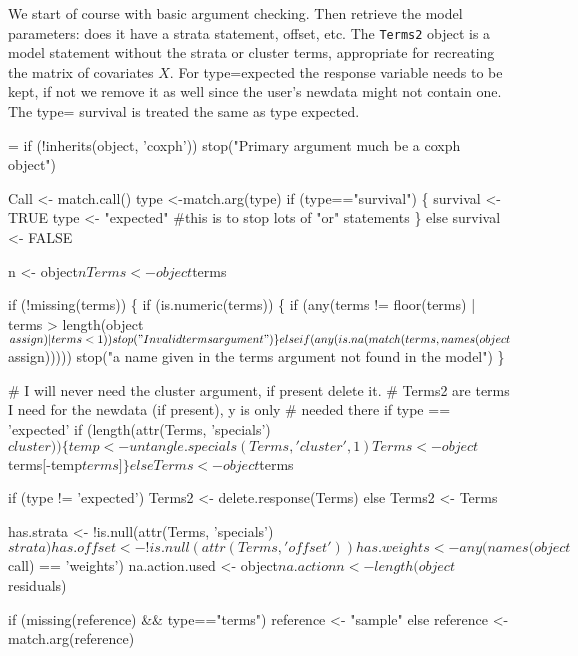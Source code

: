 \documentclass{article}
\newcommand{\code}[1]{\texttt{#1}}
\begin{document}
We start of course with basic argument checking.
Then retrieve the model parameters: does it have a strata
statement, offset, etc.  
The \code{Terms2} object is a model statement without the strata or cluster terms,
appropriate for recreating the matrix of covariates $X$.
For type=expected the response variable needs to be kept, if not we remove
it as well since the user's newdata might not contain one.    %
The type= survival is treated the same as type expected.
\begin{nwchunk}
=
 if (!inherits(object, 'coxph'))
     stop("Primary argument much be a coxph object")
 
 Call <- match.call()
 type <-match.arg(type)
 if (type=="survival") \{
     survival <- TRUE
     type <- "expected"  #this is to stop lots of "or" statements
 \}
 else survival <- FALSE
 
 n <- object$n
 Terms <-  object$terms
 
 if (!missing(terms)) \{
     if (is.numeric(terms)) \{
         if (any(terms != floor(terms) | 
                 terms > length(object$assign) |
                 terms <1)) stop("Invalid terms argument")
         \}
     else if (any(is.na(match(terms, names(object$assign)))))
        stop("a name given in the terms argument not found in the model")
     \}
 
 # I will never need the cluster argument, if present delete it.
 #  Terms2 are terms I need for the newdata (if present), y is only
 #  needed there if type == 'expected'
 if (length(attr(Terms, 'specials')$cluster)) \{
     temp <- untangle.specials(Terms, 'cluster', 1)
     Terms  <- object$terms[-temp$terms]
     \}
 else Terms <- object$terms
 
 if (type != 'expected') Terms2 <- delete.response(Terms)
 else Terms2 <- Terms
 
 has.strata <- !is.null(attr(Terms, 'specials')$strata)
 has.offset <- !is.null(attr(Terms, 'offset'))
 has.weights <- any(names(object$call) == 'weights')
 na.action.used <- object$na.action
 n <- length(object$residuals)
 
 if (missing(reference) && type=="terms") reference <- "sample"
 else reference <- match.arg(reference)
\end{nwchunk}
\end{document}
